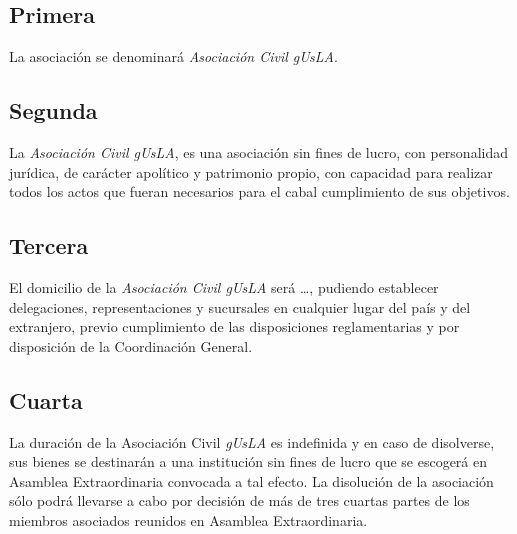     \subsection{Primera}
      La asociaci\'on se denominar\'a \emph{Asociaci\'on Civil gUsLA}.
      
    \subsection{Segunda} 
      La \emph{Asociaci\'on Civil gUsLA}, es una asociaci\'on sin
      fines de lucro, con personalidad jur\'i{}dica, de car\'acter apol\'i{}tico
      y patrimonio propio, con capacidad para realizar todos los actos que
      fueran necesarios para el cabal cumplimiento de sus objetivos.
    
    \subsection{Tercera}
      El domicilio de la \emph{Asociaci\'on Civil gUsLA} ser\'a
      \ldots, pudiendo establecer delegaciones, representaciones y sucursales en
      cualquier lugar del país y del extranjero, previo cumplimiento de las
      disposiciones reglamentarias y por disposición de la Coordinación General. 

    \subsection{Cuarta}
      La duraci\'on de la Asociaci\'on Civil \emph{gUsLA} es
      indefinida y en caso de disolverse, sus bienes se destinar\'an a una
      instituci\'on sin fines de lucro que se escoger\'a en Asamblea
      Extraordinaria convocada a tal efecto. La disoluci\'on de la asociaci\'on
      s\'olo podr\'a llevarse a cabo por decisi\'on de m\'as de tres cuartas
      partes de los miembros asociados reunidos en Asamblea Extraordinaria.
